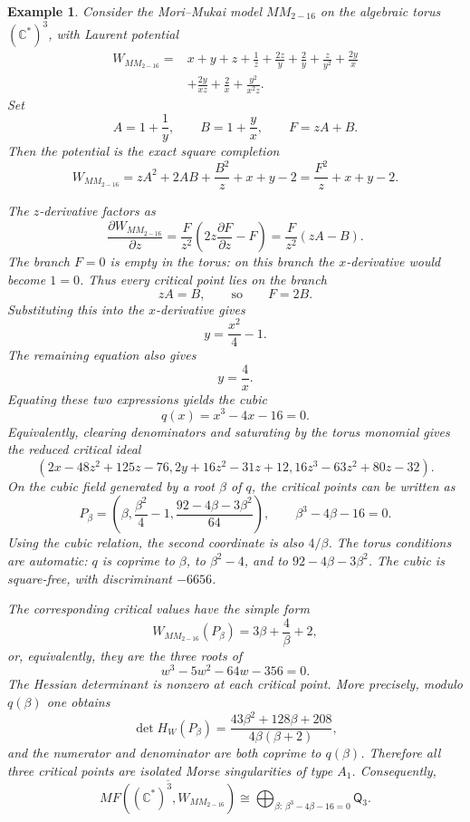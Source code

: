 \documentclass[11pt]{amsart}
\newtheorem{example}{Example}[section]
\newcommand{\MorseCat}[1]{\mathsf{Q}_{#1}}
\begin{document}
\begin{example}
Consider the Mori--Mukai model $MM_{2-16}$ on the algebraic torus
$(\mathbb{C}^*)^3$, with Laurent potential
\begin{align*}
W_{MM_{2-16}}={}&x+y+z+\frac{1}{z}+\frac{2z}{y}+\frac{2}{y}
+\frac{z}{y^2}+\frac{2y}{x} \\
&+\frac{2y}{xz}+\frac{2}{x}+\frac{y^2}{x^2z}.
\end{align*}
Set
\[
A=1+\frac{1}{y},
\qquad
B=1+\frac{y}{x},
\qquad
F=zA+B.
\]
Then the potential is the exact square completion
\[
W_{MM_{2-16}}
=zA^2+2AB+\frac{B^2}{z}+x+y-2
=\frac{F^2}{z}+x+y-2.
\]

The $z$-derivative factors as
\[
\frac{\partial W_{MM_{2-16}}}{\partial z}
=\frac{F}{z^2}\left(2z\frac{\partial F}{\partial z}-F\right)
=\frac{F}{z^2}(zA-B).
\]
The branch $F=0$ is empty in the torus: on this branch the $x$-derivative
would become $1=0$. Thus every critical point lies on the branch
\[
zA=B,
\qquad\text{so}\qquad
F=2B.
\]
Substituting this into the $x$-derivative gives
\[
y=\frac{x^2}{4}-1.
\]
The remaining equation also gives
\[
y=\frac{4}{x}.
\]
Equating these two expressions yields the cubic
\[
q(x)=x^3-4x-16=0.
\]
Equivalently, clearing denominators and saturating by the torus monomial gives
the reduced critical ideal
\[
\left(
2x-48z^2+125z-76,
2y+16z^2-31z+12,
16z^3-63z^2+80z-32
\right).
\]
On the cubic field generated by a root $\beta$ of $q$, the critical points can
be written as
\[
P_{\beta}=\left(
\beta,
\frac{\beta^2}{4}-1,
\frac{92-4\beta-3\beta^2}{64}
\right),
\qquad
\beta^3-4\beta-16=0.
\]
Using the cubic relation, the second coordinate is also $4/\beta$. The torus
conditions are automatic: $q$ is coprime to $\beta$, to $\beta^2-4$, and to
$92-4\beta-3\beta^2$. The cubic is square-free, with discriminant $-6656$.

The corresponding critical values have the simple form
\[
W_{MM_{2-16}}(P_{\beta})=3\beta+\frac{4}{\beta}+2,
\]
or, equivalently, they are the three roots of
\[
w^3-5w^2-64w-356=0.
\]
The Hessian determinant is nonzero at each critical point. More precisely,
modulo $q(\beta)$ one obtains
\[
\det H_W(P_{\beta})
=\frac{43\beta^2+128\beta+208}{4\beta(\beta+2)},
\]
and the numerator and denominator are both coprime to $q(\beta)$. Therefore
all three critical points are isolated Morse singularities of type $A_1$.
Consequently,
\[
\overline{MF((\mathbb{C}^*)^3,W_{MM_{2-16}})}
\cong \bigoplus_{\beta:\,\beta^3-4\beta-16=0}\MorseCat{3}.
\]
\end{example}
\end{document}
